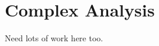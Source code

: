 \documentclass[main.tex]{subfiles}
\begin{document}
\section{Complex Analysis}
Need lots of work here too.
\end{document}
